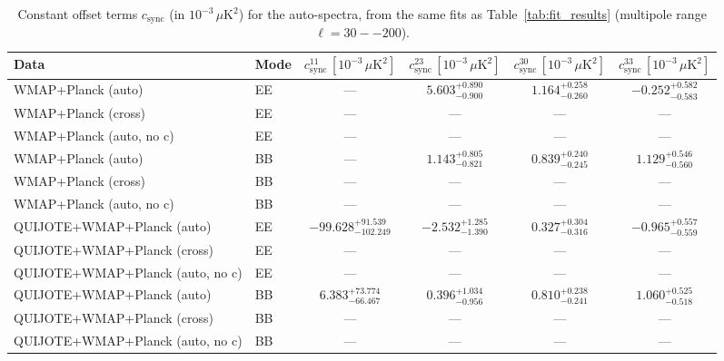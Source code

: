 \begin{table}[t]
\centering
\scriptsize
\setlength{\tabcolsep}{4pt}
\caption{Constant offset terms $c_{\mathrm{sync}}$ (in $10^{-3}\,\mu\mathrm{K}^2$) for the auto-spectra, from the same fits as Table~\ref{tab:fit_results} (multipole range $\ell=30--200$).}
\label{tab:fit_results_c_terms}
\begin{tabular}{llcccc}
\toprule
Data & Mode & $c_{\mathrm{sync}}^{11}\,[10^{-3}\,\mu\mathrm{K}^2]$ & $c_{\mathrm{sync}}^{23}\,[10^{-3}\,\mu\mathrm{K}^2]$ & $c_{\mathrm{sync}}^{30}\,[10^{-3}\,\mu\mathrm{K}^2]$ & $c_{\mathrm{sync}}^{33}\,[10^{-3}\,\mu\mathrm{K}^2]$ \\
\midrule
WMAP+Planck (auto) & EE & --- & $5.603^{+0.890}_{-0.900}$ & $1.164^{+0.258}_{-0.260}$ & $-0.252^{+0.582}_{-0.583}$ \\
WMAP+Planck (cross) & EE & --- & --- & --- & --- \\
WMAP+Planck (auto, no c) & EE & --- & --- & --- & --- \\
WMAP+Planck (auto) & BB & --- & $1.143^{+0.805}_{-0.821}$ & $0.839^{+0.240}_{-0.245}$ & $1.129^{+0.546}_{-0.560}$ \\
WMAP+Planck (cross) & BB & --- & --- & --- & --- \\
WMAP+Planck (auto, no c) & BB & --- & --- & --- & --- \\
QUIJOTE+WMAP+Planck (auto) & EE & $-99.628^{+91.539}_{-102.249}$ & $-2.532^{+1.285}_{-1.390}$ & $0.327^{+0.304}_{-0.316}$ & $-0.965^{+0.557}_{-0.559}$ \\
QUIJOTE+WMAP+Planck (cross) & EE & --- & --- & --- & --- \\
QUIJOTE+WMAP+Planck (auto, no c) & EE & --- & --- & --- & --- \\
QUIJOTE+WMAP+Planck (auto) & BB & $6.383^{+73.774}_{-66.467}$ & $0.396^{+1.034}_{-0.956}$ & $0.810^{+0.238}_{-0.241}$ & $1.060^{+0.525}_{-0.518}$ \\
QUIJOTE+WMAP+Planck (cross) & BB & --- & --- & --- & --- \\
QUIJOTE+WMAP+Planck (auto, no c) & BB & --- & --- & --- & --- \\
\bottomrule
\end{tabular}
\end{table}